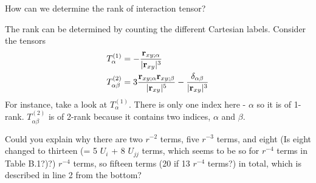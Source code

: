 \documentclass{exam}
\begin{document}
\begin{questions}

%
\question How can we determine the rank of interaction tensor?

\begin{solution}
The rank can be determined by counting the different Cartesian labels. Consider the tensors
\begin{subequations}
\label{e:interaction-tensors}
\begin{align}
  T^{(1)}_\alpha &=-\frac{{\bf r}_{xy;\alpha}}{\rvert {\bf r}_{xy} \lvert^3}  \label{e:interaction-tensors-2} \\
  T^{(2)}_{\alpha\beta} &=3\frac{{\bf r}_{xy;\alpha} {\bf r}_{xy;\beta} }{\rvert {\bf r}_{xy} \lvert^5}  
      - \frac{\delta_{\alpha\beta}}{\rvert {\bf r}_{xy} \lvert^3}             \label{e:interaction-tensors-3} 
\end{align}
\end{subequations}
%
For instance, take a look at $T^{(1)}_\alpha$. There is only one index here - $\alpha$ so it is of 1-rank.
$T^{(2)}_{\alpha\beta}$ is of 2-rank because it contains two indices, $\alpha$ and $\beta$.
\end{solution}


%
\question Could you explain why there are two $r^{-2}$ terms, five $r^{-3}$ terms, and eight (Is eight changed to thirteen (= 5 $U_i$ + 8 $U_{jj}$ terms, which seems to be so for $r^{-4}$ terms in Table B.1?)?)  $r^{-4}$ terms, so fifteen terms (20 if 13 $r^{-4}$ terms?) in total, which is described in line 2 from the bottom? 


\end{questions}
\end{document}
